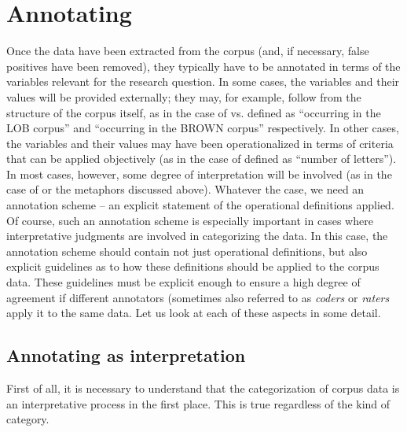\section{Annotating}
\label{sec:annotating}

Once the data have been extracted  from the corpus (and, if necessary, false positives have been removed), they typically have to be annotated  in terms of the variables relevant for the research question. In some cases, the variables and their values will be provided externally; they may, for example, follow from the structure of the corpus itself, as in the case of  vs.  defined as ``occurring in the LOB  corpus'' and ``occurring in the BROWN  corpus'' respectively. In other cases, the variables and their values may have been operationalized  in terms of criteria that can be applied objectively (as in the case of   defined as ``number of letters''). In most cases, however, some degree of interpretation will be involved (as in the case of   or the metaphors  discussed above). Whatever the case, we need an annotation  scheme -- an explicit statement of the operational definitions applied. Of course, such an annotation  scheme is especially important in cases where interpretative judgments are involved in categorizing  the data. In this case, the annotation scheme should contain not just operational  definitions, but also explicit guidelines as to how these definitions should be applied to the corpus data. These guidelines must be explicit enough to ensure a high degree of agreement if different annotators  (sometimes also referred to as \emph{coders}  or \emph{raters} apply it to the same data. Let us look at each of these aspects in some detail.

\subsection{Annotating as interpretation}
\label{sec:annotatingasinterpretation}

First of all, it is necessary to understand that the categorization  of corpus data is an interpretative process in the first place. This is true regardless of the kind of category.

